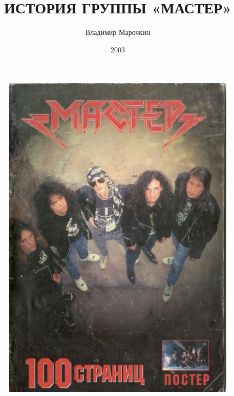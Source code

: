 \documentclass[16pt,a5paper]{book}
\begin{document}
\title{ИСТОРИЯ ГРУППЫ «МАСТЕР»}
\author{Владимир Марочкин}
\date{2003}


\begin{figure}[!ht]
    \centering
    \includegraphics[width=\paperwidth,height=\paperheight]{Cover1}
    \caption*{}
\end{figure}
\end{document}
